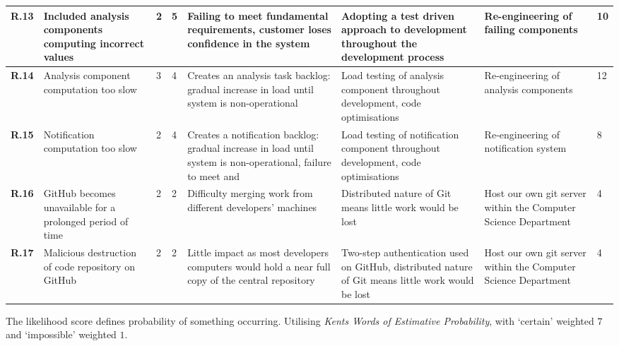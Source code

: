 \begin{longtable}[H]{| p{0.65cm} | p{2cm} | p{0.3cm} | p{0.3cm} | p{2.4cm} | p{3cm} | p{2.7cm} | p{0.4cm} |}
  \hline \textbf{R.13}
  & Included analysis components computing incorrect values
  & 2
  & 5
  & Failing to meet fundamental requirements, customer loses confidence in the system
  & Adopting a test driven approach to development throughout the development process
  & Re-engineering of failing components
  & 10\\
  
  \hline \textbf{R.14}
  & Analysis component computation too slow
  & 3
  & 4
  & Creates an analysis task backlog: gradual increase in load until system
  is non-operational
  & Load testing of analysis component throughout development, code optimisations 
  & Re-engineering of analysis components
  & 12\\  
  
  \hline \textbf{R.15}
  & Notification computation too slow
  & 2
  & 4
  & Creates a notification backlog: gradual increase in load until system
  is non-operational, failure to meet \nfrit13 and \frit9
  & Load testing of notification component throughout development, code optimisations 
  & Re-engineering of notification system
  & 8\\
  
  \hline \textbf{R.16}
  & GitHub becomes unavailable for a prolonged period of time
  & 2
  & 2
  & Difficulty merging work from different developers' machines
  & Distributed nature of Git means little work would be lost
  & Host our own git server within the Computer Science Department
  & 4\\ 
  
  \hline \textbf{R.17}
  & Malicious destruction of code repository on GitHub
  & 2
  & 2
  & Little impact as most developers computers would hold a near full copy of the central repository
  & Two-step authentication used on GitHub, distributed nature of Git means little work would be lost
  & Host our own git server within the Computer Science Department
  & 4\\    
    
  \hline
\end{longtable}       

The likelihood score defines probability of something occurring. Utilising
\textit{Kents Words of Estimative Probability}\cite{kent1966strategic}, with
`certain' weighted $7$ and `impossible' weighted $1$.

